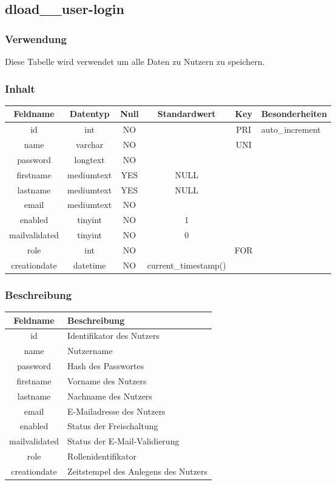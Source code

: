 \subsection{dload\_\_user-login}
\subsubsection{Verwendung} Diese Tabelle wird verwendet um alle Daten zu Nutzern zu speichern.
\subsubsection{Inhalt}
\begin{table}[H]
	\begin{tabular}{|c|c|c|c|c|p{3.5cm}|}
		\hline
		\textbf{Feldname} & \textbf{Datentyp} & \textbf{Null} & \textbf{Standardwert} & \textbf{Key}   & \textbf{Besonderheiten} \\ \hline
		id & int & NO &  & PRI & auto\_increment \\ \hline
		name & varchar & NO &  & UNI & \\ \hline
		password & longtext & NO &  &  & \\ \hline
		firstname & mediumtext & YES & NULL &  & \\ \hline
		lastname & mediumtext & YES & NULL &  & \\ \hline
		email & mediumtext & NO &  &  & \\ \hline
		enabled & tinyint & NO & 1 &  & \\ \hline
		mailvalidated & tinyint & NO & 0 &  & \\ \hline
		role & int & NO &  & FOR & \\ \hline
		creationdate & datetime & NO & current\_timestamp() &  & \\ \hline
	\end{tabular}
\end{table}
\subsubsection{Beschreibung}
\begin{table}[H]
	\begin{tabular}{|c|p{12cm}|}
		\hline
		\textbf{Feldname} & \textbf{Beschreibung} \\ \hline
		id & Identifikator des Nutzers \\ \hline
		name & Nutzername \\ \hline
		password & Hash des Passwortes \\ \hline
		firstname & Vorname des Nutzers \\ \hline
		lastname & Nachname des Nutzers \\ \hline
		email & E-Mailadresse des Nutzers \\ \hline
		enabled & Status der Freischaltung \\ \hline
		mailvalidated & Status der E-Mail-Validierung \\ \hline
		role & Rollenidentifikator \\ \hline
		creationdate & Zeitstempel des Anlegens des Nutzers \\ \hline
	\end{tabular}
\end{table}
